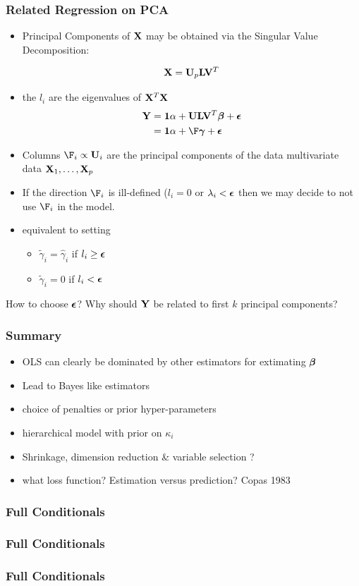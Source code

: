 \documentclass[handout]{beamer}
\begin{document}
\begin{frame} \frametitle{Related Regression on PCA}
  \begin{itemize}
  \item 
  Principal Components of $\mathbf{X}$ may be obtained via the Singular Value
  Decomposition:  

$$\mathbf{X} = \mathbf{U}_p \mathbf{L} \mathbf{V}^T$$   
\pause
\item the $l_i$ are the eigenvalues of $\mathbf{X}^T\mathbf{X}$ \pause
  \begin{align*}
 \Y & = \one \alpha + \U \L \V^T \b + \eps  \\
    & = \one \alpha + \F \g + \eps \\ 
  \end{align*}
\item Columns $\F_i \propto \U_i$ are the principal components of the
  data multivariate data $\mathbf{X}_1, \ldots, \mathbf{X}_p$ \pause
\item If the direction $\F_i$ is ill-defined ($l_i = 0$  or $\lambda_i < \boldsymbol{\epsilon}$
     then we may decide to not use $\F_i$ in the model.  \pause
\item equivalent to setting
  \begin{itemize}
  \item $\tilde{\gamma}_i = \hat{\gamma}_i$ if  $l_i\geq \boldsymbol{\epsilon}$
  \item $\tilde{\gamma}_i = 0$ if  $l_i < \boldsymbol{\epsilon}$ \pause
  \end{itemize}
  \end{itemize}
How to choose $\boldsymbol{\epsilon}$?   Why should $\mathbf{Y}$ be related to first $k$
principal components?
\end{frame}
\begin{frame} \frametitle{Summary }

  \begin{itemize}
  \item OLS can clearly be dominated by other estimators for
    extimating $\boldsymbol{\beta}$  \pause
  \item Lead to Bayes like estimators \pause
  \item choice of penalties or prior hyper-parameters \pause
  \item hierarchical model with prior on $\kappa_i$ \pause
  \item Shrinkage, dimension reduction \& variable selection ? \pause
  \item what loss function?  Estimation versus prediction?  Copas 1983
  \end{itemize}

\end{frame}

\begin{frame} \frametitle{Full Conditionals}
  
\end{frame}

\begin{frame} \frametitle{Full Conditionals}
  
\end{frame}

\begin{frame} \frametitle{Full Conditionals}
   
\end{frame}
\end{document}
